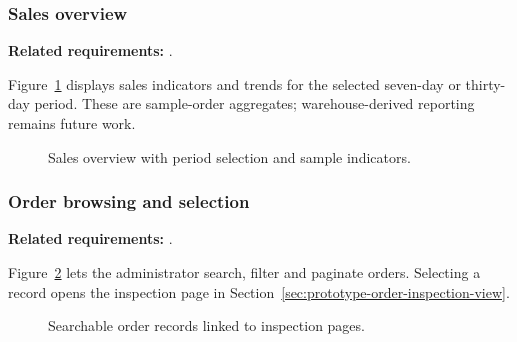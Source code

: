 \begin{samepage}
\subsubsection{Sales overview}
\label{sec:prototype-sales-view}

\textbf{Related requirements:} .

Figure~\ref{fig:prototype-sales} displays sales indicators and trends for the
selected seven-day or thirty-day period. These are sample-order aggregates;
warehouse-derived reporting remains future work.

\nopagebreak[4]
\begin{figure}[H]
  \centering
  \caption{Sales overview with period selection and sample indicators.}
  \label{fig:prototype-sales}
\end{figure}
\end{samepage}

\begin{samepage}
\subsubsection{Order browsing and selection}
\label{sec:prototype-orders-view}

\textbf{Related requirements:} .

Figure~\ref{fig:prototype-orders} lets the administrator search, filter and
paginate orders. Selecting a record opens the inspection page in
Section~\ref{sec:prototype-order-inspection-view}.

\nopagebreak[4]
\begin{figure}[H]
  \centering
  \caption{Searchable order records linked to inspection pages.}
  \label{fig:prototype-orders}
\end{figure}
\end{samepage}

